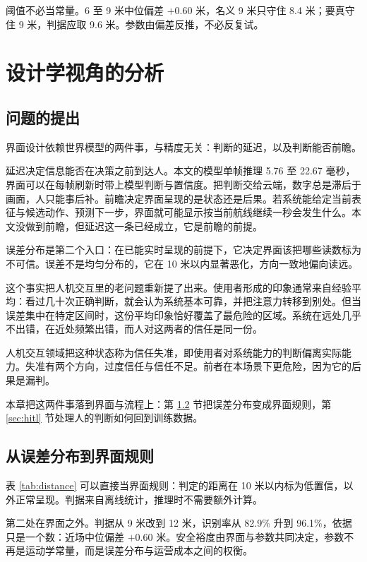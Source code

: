 \documentclass[12pt,a4paper]{ctexart}
\begin{document}
阈值不必当常量。6 至 9 米中位偏差 $+0.60$ 米，名义 9 米只守住 8.4 米；要真守住 9 米，判据应取 9.6 米。参数由偏差反推，不必反复试。

\section{设计学视角的分析}

\subsection{问题的提出}

界面设计依赖世界模型的两件事，与精度无关：判断的延迟，以及判断能否前瞻。

延迟决定信息能否在决策之前到达人。本文的模型单帧推理 5.76 至 22.67 毫秒，界面可以在每帧刷新时带上模型判断与置信度。把判断交给云端，数字总是滞后于画面，人只能事后补。前瞻决定界面呈现的是状态还是后果。若系统能给定当前表征与候选动作、预测下一步，界面就可能显示按当前航线继续一秒会发生什么。本文没做到前瞻，但延迟这一条已经成立，它是前瞻的前提。

误差分布是第二个入口：在已能实时呈现的前提下，它决定界面该把哪些读数标为不可信。误差不是均匀分布的，它在 10 米以内显著恶化，方向一致地偏向读远。

这个事实把人机交互里的老问题重新提了出来。使用者形成的印象通常来自经验平均：看过几十次正确判断，就会认为系统基本可靠，并把注意力转移到别处。但当误差集中在特定区间时，这份平均印象恰好覆盖了最危险的区域。系统在远处几乎不出错，在近处频繁出错，而人对这两者的信任是同一份。

人机交互领域把这种状态称为信任失准，即使用者对系统能力的判断偏离实际能力。失准有两个方向，过度信任与信任不足。前者在本场景下更危险，因为它的后果是漏判。

本章把这两件事落到界面与流程上：第 \ref{sec:ui} 节把误差分布变成界面规则，第 \ref{sec:hitl} 节处理人的判断如何回到训练数据。

\subsection{从误差分布到界面规则}
\label{sec:ui}

表 \ref{tab:distance} 可以直接当界面规则：判定的距离在 10 米以内标为低置信，以外正常呈现。判据来自离线统计，推理时不需要额外计算。

第二处在界面之外。判据从 9 米改到 12 米，识别率从 82.9\% 升到 96.1\%，依据只是一个数：近场中位偏差 $+0.60$ 米。安全裕度由界面与参数共同决定，参数不再是运动学常量，而是误差分布与运营成本之间的权衡。
\end{document}

